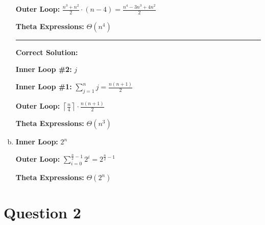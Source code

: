 \documentclass[12pt]{article}
\begin{document}
\begin{enumerate}[a.]
    \textbf{Outer Loop:} $\displaystyle\frac{n^3 + n^2}{2} \cdot (n - 4) = \displaystyle\frac{n^4 - 3n^3 + 4n^2}{2}$

    \textbf{Theta Expressions:} $\Theta (n^4)$

    \noindent\rule{\textwidth}{1pt}

    \textbf{Correct Solution:}

    \bigskip

    \textbf{Inner Loop \#2:} $j$

    \textbf{Inner Loop \#1:} $\sum\limits_{j=1}^n j = \displaystyle\frac{n(n+1)}{2}$

    \textbf{Outer Loop:} $\left\lceil \displaystyle\frac{n}{4} \right\rceil \cdot \displaystyle\frac{n(n+1)}{2}$

    \textbf{Theta Expressions:} $\Theta (n^3)$
    \item

    \textbf{Inner Loop:} $2^n$

    \textbf{Outer Loop:} $\displaystyle\sum\limits_{i=0}^{\frac{n}{2} - 1} 2^i = 2^{\frac{n}{2} - 1}$

    \textbf{Theta Expressions:} $\Theta (2^n)$


\end{enumerate}

\section*{Question 2}
\end{document}
